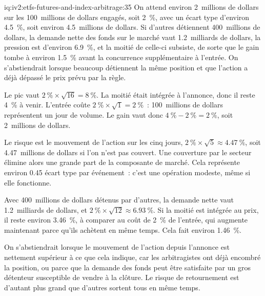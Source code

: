 \begin{solution}{iq:iv2:etfs-futures-and-index-arbitrage:35}
On attend environ 2~millions de dollars sur les 100~millions de dollars engagés, soit 2~\%, avec un écart type d'environ 4.5~\%, soit environ 4.5~millions de dollars. Si d'autres détiennent 400~millions de dollars, la demande nette des fonds sur le marché vaut 1.2~milliards de dollars, la pression est d'environ 6.9~\%, et la moitié de celle-ci subsiste, de sorte que le gain tombe à environ 1.5~\% avant la concurrence supplémentaire à l'entrée. On s'abstiendrait lorsque beaucoup détiennent la même position et que l'action a déjà dépassé le prix prévu par la règle.

Le pic vaut $2~\% \times \sqrt{16} = 8~\%$. La moitié était intégrée à l'annonce, donc il reste 4~\% à venir. L'entrée coûte $2~\% \times \sqrt{1} = 2~\%$~: 100~millions de dollars représentent un jour de volume. Le gain vaut donc $4~\% - 2~\% = 2~\%$, soit 2~millions de dollars.

Le risque est le mouvement de l'action sur les cinq jours, $2~\% \times \sqrt 5 \approx 4.47~\%$, soit 4.47~millions de dollars si l'on n'est pas couvert. Une couverture par le secteur élimine alors une grande part de la composante de marché. Cela représente environ 0.45 écart type par événement~: c'est une opération modeste, même si elle fonctionne.

Avec 400~millions de dollars détenus par d'autres, la demande nette vaut 1.2~milliards de dollars, et $2~\% \times \sqrt{12} \approx 6.93~\%$. Si la moitié est intégrée au prix, il reste environ 3.46~\%, à comparer au coût de 2~\% de l'entrée, qui augmente maintenant parce qu'ils achètent en même temps. Cela fait environ 1.46~\%.

On s'abstiendrait lorsque le mouvement de l'action depuis l'annonce est nettement supérieur à ce que cela indique, car les arbitragistes ont déjà encombré la position, ou parce que la demande des fonds peut être satisfaite par un gros détenteur susceptible de vendre à la clôture. Le risque de retournement est d'autant plus grand que d'autres sortent tous en même temps.

\end{solution}
